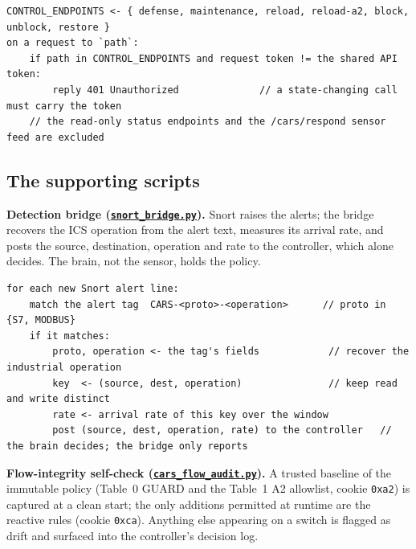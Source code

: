 \begin{lstlisting}[style=carspseudo,caption={Token gate on the control endpoints, in pseudocode.},label={lst:auth}]
CONTROL_ENDPOINTS <- { defense, maintenance, reload, reload-a2, block, unblock, restore }
on a request to `path`:
    if path in CONTROL_ENDPOINTS and request token != the shared API token:
        reply 401 Unauthorized              // a state-changing call must carry the token
    // the read-only status endpoints and the /cars/respond sensor feed are excluded
\end{lstlisting}

\subsection*{The supporting scripts}

\noindent \textbf{Detection bridge (\href{\repourl/blob/main/06_Build/snort_bridge.py}{\texttt{snort\_bridge.py}}).} Snort raises the alerts; the bridge recovers the ICS operation from the alert text, measures its arrival rate, and posts the source, destination, operation and rate to the controller, which alone decides. The brain, not the sensor, holds the policy.

\begin{lstlisting}[style=carspseudo,caption={Operation recovery from the Snort alert, forwarded to the controller, in pseudocode.},label={lst:bridge}]
for each new Snort alert line:
    match the alert tag  CARS-<proto>-<operation>      // proto in {S7, MODBUS}
    if it matches:
        proto, operation <- the tag's fields            // recover the industrial operation
        key  <- (source, dest, operation)               // keep read and write distinct
        rate <- arrival rate of this key over the window
        post (source, dest, operation, rate) to the controller   // the brain decides; the bridge only reports
\end{lstlisting}

\noindent \textbf{Flow-integrity self-check (\href{\repourl/blob/main/06_Build/cars_flow_audit.py}{\texttt{cars\_flow\_audit.py}}).} A trusted baseline of the immutable policy (Table~0 GUARD and the Table~1 A2 allowlist, cookie \texttt{0xa2}) is captured at a clean start; the only additions permitted at runtime are the reactive rules (cookie \texttt{0xca}). Anything else appearing on a switch is flagged as drift and surfaced into the controller's decision log.

